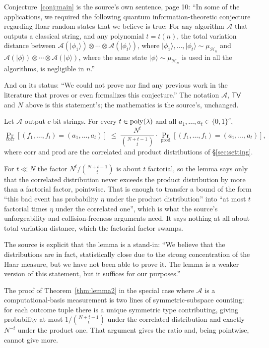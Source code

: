 \documentclass{aicr-conjecture}
\newcommand{\bits}{\{0,1\}}
\newcommand{\muH}{\mu_{\mathcal{H}_{n}}}
\newcommand{\A}{\mathcal{A}}
\newcommand{\TV}{\mathsf{TV}}
\newcommand{\ket}[1]{\lvert#1\rangle}
\begin{document}
\begin{remark}\label{rem:framing}
Conjecture~\ref{conj:main} is the source's own sentence, page 10:
``In some of the applications, we required the following quantum
information-theoretic conjecture regarding Haar random states that we
believe is true: For any algorithm $\A$ that outputs a classical string,
and any polynomial $t = t(n)$, the total variation distance between
$\A(\ket{\phi_1}) \otimes \cdots \otimes \A(\ket{\phi_t})$, where
$\ket{\phi_1}, \dots, \ket{\phi_t} \sim \muH$ and
$\A(\ket{\phi}) \otimes \cdots \otimes \A(\ket{\phi})$, where the same
state $\ket{\phi} \sim \muH$ is used in all the algorithms, is negligible
in $n$.''

And on its status: ``We could not prove nor find any previous work in the
literature that proves or even formalizes this conjecture.'' The
notation $\A$, $\TV$ and $N$ above is this statement's; the mathematics
is the source's, unchanged.
\end{remark}

\begin{theorem}\label{thm:lemma2}
Let $\A$ output $c$-bit strings. For every $t \in \mathrm{poly}(\lambda)$ and all
$a_1, \dots, a_t \in \bits^{c}$,
\[
  \Pr_{\mathrm{corr}}[(f_1,\dots,f_t) = (a_1,\dots,a_t)]
  \;\le\;
  \frac{N^{t}}{\binom{N+t-1}{t}} \cdot
  \Pr_{\mathrm{prod}}[(f_1,\dots,f_t) = (a_1,\dots,a_t)],
\]
where $\mathrm{corr}$ and $\mathrm{prod}$ are the correlated and product
distributions of \S\ref{sec:setting}.
\end{theorem}

\begin{remark}\label{rem:gap}
For $t \ll N$ the factor $N^{t} / \binom{N+t-1}{t}$ is about $t$ factorial, so the
lemma says only that the correlated distribution never exceeds the
product distribution by more than a factorial factor, pointwise. That is
enough to transfer a bound of the form ``this bad event has probability
$\eta$ under the product distribution'' into ``at most $t$ factorial times $\eta$
under the correlated one'', which is what the source's unforgeability and
collision-freeness arguments need. It says nothing at all about total
variation distance, which the factorial factor swamps.

The source is explicit that the lemma is a stand-in: ``We believe that
the distributions are in fact, statistically close due to the strong
concentration of the Haar measure, but we have not been able to prove
it. The lemma is a weaker version of this statement, but it suffices for
our purposes.''

The proof of Theorem~\ref{thm:lemma2} in the special case where $\A$ is a
computational-basis measurement is two lines of symmetric-subspace
counting: for each outcome tuple there is a unique symmetric type
contributing, giving probability at most $1/\binom{N+t-1}{t}$ under the
correlated distribution and exactly $N^{-t}$ under the product one. That
argument gives the ratio and, being pointwise, cannot give more.
\end{remark}
\end{document}
